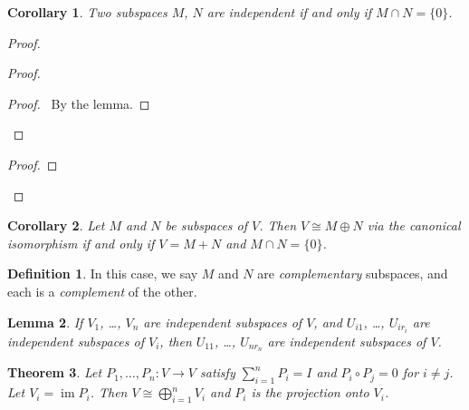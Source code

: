 \documentclass{book}
\let\qed\relax
\newtheorem{lm}{Lemma}[chapter]
\newtheorem{thm}[lm]{Theorem}
\newtheorem{cor}{Corollary}[lm]
\theoremstyle{definition}
\newtheorem{df}[lm]{Definition}
\newcommand{\im}{\ensuremath{\operatorname{im}}}
\begin{document}
  \begin{cor}
    Two subspaces $M$, $N$ are independent if and only if $M \cap N = \{ 0 \}$.
  \end{cor}
  
  \begin{proof}
    \pf
    \begin{proof}
      \begin{proof}
        \pf\ By the lemma.
      \end{proof}
    \end{proof}
    \begin{proof}
    \end{proof}
    \qed
  \end{proof}
  
  \begin{cor}
    Let $M$ and $N$ be subspaces of $V$. Then $V \cong M \oplus N$ via the 
    canonical isomorphism if and only if $V = M + N$ and $M \cap N = \{ 0 \}$.
  \end{cor}
  
  \begin{df}
    In this case, we say $M$ and $N$ are \emph{complementary} subspaces, and 
    each 
    is a \emph{complement} of the other.
  \end{df}
  
  \begin{lm}
    If $V_1$, \ldots, $V_n$ are independent subspaces of $V$, and $U_{i1}$, 
    \ldots, $U_{ir_i}$ are independent subspaces of $V_i$, then $U_{11}$, 
    \ldots, 
    $U_{nr_n}$ are independent subspaces of $V$.
  \end{lm}
  
  \begin{thm}
    \label{thm:linear:direct_sum}
    Let $P_1, \ldots, P_n : V \rightarrow V$ satisfy $\sum_{i=1}^n P_i = I$ and 
    $P_i \circ P_j = 0$ for $i \neq j$. Let $V_i = \im P_i$. Then $V \cong 
    \bigoplus_{i=1}^n V_i$ and $P_i$ is the projection onto $V_i$.
  \end{thm}
  
\end{document}
